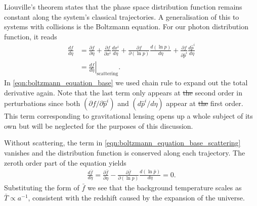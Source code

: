 \documentclass[a4paper,12pt,times,custombib,print,index]{Classes/PhDThesisPSnPDF} %
\providecommand{\DIFadd}[1]{{\protect\color{blue}\uwave{#1}}} %
\providecommand{\DIFdel}[1]{{\protect\color{red}\sout{#1}}}                      %
\providecommand{\DIFaddbegin}{} %
\providecommand{\DIFaddend}{} %
\providecommand{\DIFdelbegin}{} %
\providecommand{\DIFdelend}{} %
\newcommand{\DIFscaledelfig}{0.5}
\newlength{\DIFdelgraphicswidth} %
\newlength{\DIFdelgraphicsheight} %
\newcommand{\DIFaddincludegraphics}[2][]{{\color{blue}\fbox{\DIFOincludegraphics[#1]{#2}}}} %
\newcommand{\DIFdelincludegraphics}[2][]{%
\sbox{\DIFdelgraphicsbox}{\DIFOincludegraphics[#1]{#2}}%
\settoboxwidth{\DIFdelgraphicswidth}{\DIFdelgraphicsbox} %
\settoboxtotalheight{\DIFdelgraphicsheight}{\DIFdelgraphicsbox} %
\scalebox{\DIFscaledelfig}{%
\parbox[b]{\DIFdelgraphicswidth}{\usebox{\DIFdelgraphicsbox}\\[-\baselineskip] \rule{\DIFdelgraphicswidth}{0em}}\llap{\resizebox{\DIFdelgraphicswidth}{\DIFdelgraphicsheight}{%
\setlength{\unitlength}{\DIFdelgraphicswidth}%
\begin{picture}(1,1)%
\thicklines\linethickness{2pt} %
{\color[rgb]{1,0,0}\put(0,0){\framebox(1,1){}}}%
{\color[rgb]{1,0,0}\put(0,0){\line( 1,1){1}}}%
{\color[rgb]{1,0,0}\put(0,1){\line(1,-1){1}}}%
\end{picture}%
}\hspace*{3pt}}} %
} %
\DeclareRobustCommand{\DIFaddbegin}{\DIFOaddbegin \let\includegraphics\DIFaddincludegraphics} %
\DeclareRobustCommand{\DIFaddend}{\DIFOaddend \let\includegraphics\DIFOincludegraphics} %
\DeclareRobustCommand{\DIFdelbegin}{\DIFOdelbegin \let\includegraphics\DIFdelincludegraphics} %
\DeclareRobustCommand{\DIFdelend}{\DIFOaddend \let\includegraphics\DIFOincludegraphics} %
\begin{document}
Liouville's theorem states that the phase space distribution function remains constant along the system's classical trajectories. A generalisation of this to systems with collisions is the Boltzmann equation. For our photon distribution function, it reads
\begin{align}
	\frac{df}{d\eta} &= \frac{\partial f}{\partial \eta} + \frac{\partial f}{\partial x^i}\frac{dx^i}{d\eta} + \frac{\partial f}{\partial(\ln  p)}\frac{d(\ln p)}{d\eta} + \frac{\partial f}{\partial \hat{p}^i}\frac{d\hat{p}^i}{d\eta} \label{eqn:boltzmann_equation_base}\\
	&= \left. \frac{df}{d\eta} \right|_\text{scattering} . \label{eqn:boltzmann_equation_base_scattering}
\end{align}
In \eqref{eqn:boltzmann_equation_base} we used \DIFaddbegin \DIFadd{the }\DIFaddend chain rule to expand out the total derivative again. Note that the last term only appears at \DIFdelbegin \DIFdel{the }\DIFdelend second order in perturbations since both $(\partial f/\partial \hat{p}^i)$ and $(d\hat{p}^i/d\eta)$ appear at \DIFdelbegin \DIFdel{the }\DIFdelend first order. This term corresponding to gravitational lensing opens up a whole subject of its own but will be neglected for the purposes of this discussion.

Without scattering, the term in \eqref{eqn:boltzmann_equation_base_scattering} vanishes and the distribution function is conserved along each trajectory. The zeroth order part of the equation yields
\begin{align}
	\frac{d\bar{f}}{d\eta} = \frac{\partial \bar{f}}{\partial\eta} - \frac{\partial \bar{f}}{\partial(\ln p)}\frac{d(\ln\bar{p})}{d\eta} = 0. \label{eqn:boltzmann_equation_collisionless_zeroth}
\end{align}
Substituting the form of $\bar{f}$ we see that the background temperature scales as $\bar{T}\propto a^{-1}$, consistent with the redshift caused by the expansion of the universe.
\end{document}
